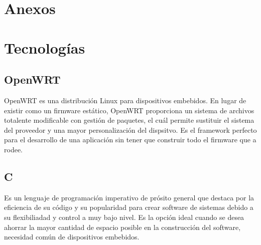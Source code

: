 \documentclass{article}
\begin{document}







\section{Anexos}



\section{Tecnologías}
    \subsection{OpenWRT}
        OpenWRT es una distribución Linux para dispositivos embebidos. En lugar de existir como un firmware estático, OpenWRT proporciona un sistema de archivos totalente modificable con gestión de paquetes, el cuál permite sustituir el sistema del proveedor y una mayor personalización del dispsitvo. Es el framework perfecto para el desarrollo de una aplicación sin tener que construir todo el firmware que a rodee.

    \subsection{C}
        Es un lenguaje de programación imperativo de prósito general que destaca por la eficiencia de su código y su popularidad para crear software de sistemas debido a su flexibiliadad y control a muy bajo nivel. Es la opción ideal cuando se desea ahorrar la mayor cantidad de espacio posible en la construcción del software, necesidad común de dispositivos embebidos. 
\end{document}
